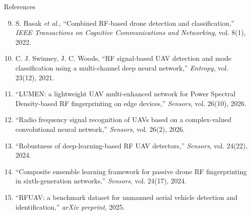 \documentclass[aspectratio=169,11pt]{beamer}
\begin{document}
\begin{frame}{References}
\scriptsize
\begin{enumerate}
\setcounter{enumi}{8}
\item S. Basak \textit{et al.}, ``Combined RF-based drone detection and
classification,'' \textit{IEEE Transactions on Cognitive Communications and
Networking}, vol. 8(1), 2022.
\item C. J. Swinney, J. C. Woods, ``RF signal-based UAV detection and mode
classification using a multi-channel deep neural network,'' \textit{Entropy},
vol. 23(12), 2021.
\item ``LUMEN: a lightweight UAV multi-enhanced network for Power Spectral
Density-based RF fingerprinting on edge devices,'' \textit{Sensors},
vol. 26(10), 2026.
\item ``Radio frequency signal recognition of UAVs based on a complex-valued
convolutional neural network,'' \textit{Sensors}, vol. 26(2), 2026.
\item ``Robustness of deep-learning-based RF UAV detectors,'' \textit{Sensors},
vol. 24(22), 2024.
\item ``Composite ensemble learning framework for passive drone RF
fingerprinting in sixth-generation networks,'' \textit{Sensors}, vol. 24(17),
2024.
\item ``RFUAV: a benchmark dataset for unmanned aerial vehicle detection and
identification,'' \textit{arXiv preprint}, 2025.
\end{enumerate}
\end{frame}
\end{document}
